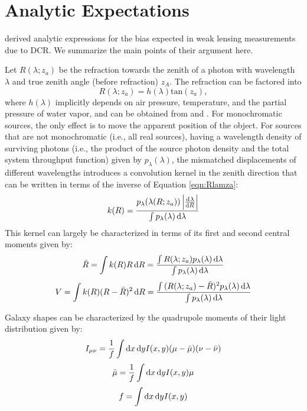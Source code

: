 \documentclass[apj]{emulateapj}
\begin{document}
\section{Analytic Expectations}\label{sec:analytic}
\citet[][hereafter PB12]{Plazas2012} derived analytic expressions for
the bias expected in weak lensing measurements due to DCR.  We
summarize the main points of their argument here.

Let $R(\lambda; z_a)$ be the refraction towards the zenith of a photon
with wavelength $\lambda$ and true zenith angle (before refraction)
$z_A$.  The refraction can be factored into
\begin{equation}
  R(\lambda; z_a) =  h(\lambda) \mathrm{tan}(z_a),
  \label{eqn:Rlamza}
\end{equation}
where $h(\lambda)$ implicitly depends on air pressure, temperature,
and the partial pressure of water vapor, and can be obtained from
\citet{Edlen1953} and \citet{Coleman1960}.  For monochromatic sources,
the only effect is to move the apparent position of the object.  For
sources that are not monochromatic (i.e., all real sources), having a
wavelength density of surviving photons (i.e., the product of the
source photon density and the total system throughput function) given
by $p_{\lambda}(\lambda)$, the mismatched displacements of different
wavelengths introduces a convolution kernel in the zenith direction
that can be written in terms of the inverse of Equation
\ref{eqn:Rlamza}:
\begin{equation}
  k(R) = \frac{p_\lambda(\lambda(R; z_a)) \left|\od{\lambda}{R}\right|}{\int{p_\lambda(\lambda) \dif{\lambda}}}
  \label{eqn:convker}
\end{equation}
This kernel can largely be characterized in terms of its first and
second central moments given by:
\begin{equation}
  \bar{R} = \int{k(R) R \dif{R} } = \frac{\int{R(\lambda; z_a) p_\lambda(\lambda)\dif{\lambda} }}{\int{p_\lambda(\lambda) \dif{\lambda}}}
  \label{eqn:rbar}
\end{equation}
\begin{equation}
  V = \int{k(R) (R - \bar{R})^2 \dif{R} } = \frac{\int{(R(\lambda; z_a) - \bar{R})^2 p_\lambda(\lambda)\dif{\lambda} }}{\int{p_\lambda(\lambda) \dif{\lambda}}}
  \label{eqn:V}
\end{equation}

Galaxy shapes can be characterized by the quadrupole moments of their
light distribution given by:
\begin{equation}
  I_{\mu \nu} = \frac{1}{f}\int{\dif{x} \dif{y} I(x,y)(\mu - \bar{\mu})(\nu - \bar{\nu})}
\end{equation}
\begin{equation}
  \bar{\mu} = \frac{1}{f}\int{\dif{x} \dif{y} I(x,y)\mu}
\end{equation}
\begin{equation}
  f = \int{\dif{x} \dif{y} I(x,y)}
\end{equation}
\end{document}
